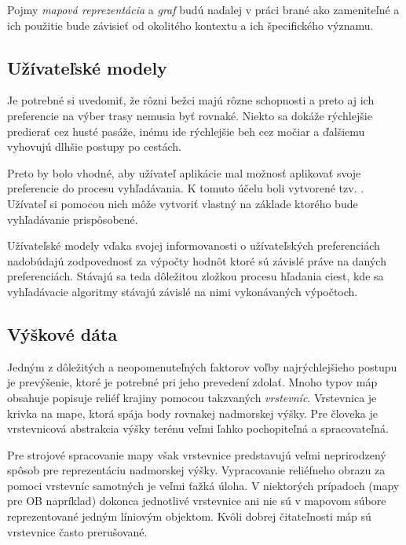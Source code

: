 Pojmy \textit{mapová reprezentácia} a \textit{graf} budú naďalej v práci brané ako zameniteľné a ich použitie bude závisieť od okolitého kontextu a ich špecifického významu.

\subsection{Užívateľské modely}\label{uzivatelske_modely}

Je potrebné si uvedomiť, že rôzni bežci majú rôzne schopnosti a preto aj ich preferencie na výber trasy nemusia byť rovnaké. Niekto sa dokáže rýchlejšie predierať cez husté pasáže, inému ide rýchlejšie beh cez močiar a ďalšiemu vyhovujú dlhšie postupy po cestách. 

Preto by bolo vhodné, aby užívateľ aplikácie mal možnosť aplikovať svoje preferencie do procesu vyhľadávania. K tomuto účelu boli vytvorené tzv. . Užívateľ si pomocou nich môže vytvoriť vlastný  na základe ktorého bude vyhľadávanie prispôsobené.

Užívateľské modely vďaka svojej informovanosti o užívateľských preferenciách nadobúdajú zodpovednosť za výpočty hodnôt ktoré sú závislé práve na daných preferenciách. Stávajú sa teda dôležitou zložkou procesu hľadania ciest, kde sa vyhľadávacie algoritmy stávajú závislé na nimi vykonávaných výpočtoch.

\subsection{Výškové dáta}\label{vyskove_data}

Jedným z dôležitých a neopomenuteľných faktorov voľby najrýchlejšieho postupu je prevýšenie, ktoré je potrebné pri jeho prevedení zdolať. Mnoho typov máp obsahuje popisuje reliéf krajiny pomocou takzvaných \textit{vrstevníc}. Vrstevnica je krivka na mape, ktorá spája body rovnakej nadmorskej výšky. Pre človeka je vrstevnicová abstrakcia výšky terénu veľmi ľahko pochopiteľná a spracovateľná.

Pre strojové spracovanie mapy však vrstevnice predstavujú veľmi neprirodzený spôsob pre reprezentáciu nadmorskej výšky. Vypracovanie reliéfneho obrazu za pomoci vrstevníc samotných je veľmi ťažká úloha. V niektorých prípadoch (mapy pre OB napríklad) dokonca jednotlivé vrstevnice ani nie sú v mapovom súbore reprezentované jedným líniovým objektom. Kvôli dobrej čitateľnosti máp sú vrstevnice často prerušované.

